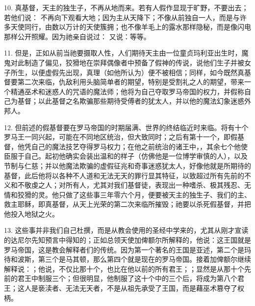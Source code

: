 10. 真基督，天主的独生子，不再从地而来。若有人假作显现于旷野，不要出去；若他们说：  不再向下观看大地；因为主从天降下；不像从前独自一人，而是与许多天使同行，由数以万计的天使簇拥；也不像羊毛上的露水那样隐秘，而是像闪电那样公开照耀。因为祂亲自说过：  又说：等等。\par

11. 但是，正如从前当祂要摄取人性，人们期待天主由一位童贞玛利亚出生时，魔鬼对此制造了偏见，狡猾地在崇拜偶像者中预备了假神的传说，说他们生子并被女子所生，以便虚假先出现，真理（如他所认为）便不被相信；同样，如今既然真基督要第二次来临，仇敌利用头脑简单者的期望，特别是受割礼之人的期望，带来一个精通巫术和迷惑人的咒语的魔法师；他将为自己夺取罗马帝国的权力，并假称自己为基督；以此基督之名欺骗那些期待受傅者的犹太人，并以他的魔法幻象迷惑外邦人。\par

12. 但前述的假基督要在罗马帝国的时期届满、世界的终结临近时来临。将有十个罗马王一同兴起，可能在不同地区统治，但大致同时；之后有第十一个，即假基督，他凭自己的魔法技艺夺得罗马权力；在他之前统治的诸王中，，其余七个他使臣服于自己。起初他确实会装出温和的样子（仿佛他是一位博学审慎的人），以及节制与仁慈；并以他魔法欺骗的虚假征兆和奇事迷惑犹太人，好像他就是所期待的基督，此后他将以各种不人道和无法无天的罪行显其特征，以致超过所有先前的不义和不敬虔之人；对所有人，尤其对我们基督徒，表现出一种嗜杀、极其残忍、无情和狡猾的灵。他只做了这些事三年零六个月，便要被天主的独生子、我们的主、救主耶稣，即真基督，从天上光荣的第二次来临所摧毁；祂要以杀死假基督，并把他投入地狱之火。\par

13. 这些事并非我们自己杜撰，而是从教会使用的圣经中学来的，尤其从刚才宣读的达尼尔先知预言中得知的；正如总领天使加俾额尔所解释的，他说：这王国就是罗马帝国，这是教会解释者们的传统。因为第一个著名的王国是亚述，第二个是玛待和波斯，第三个是马其顿，那么第四个就是现在的罗马帝国。接着加俾额尔继续解释说：；他说，不仅比那十个，也比在他以前的所有君王；；显然是从那十个先前的君王中制服三个；但很明显，他制服了这十个中的三个后，将成为第八个君王；这人是亵渎者、无法无天者，不是从祖先承受了王国，而是藉巫术篡夺了权柄。\par

